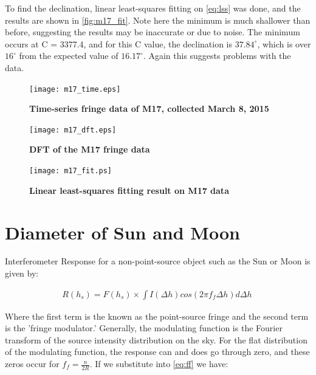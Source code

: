 \documentclass{article}
\begin{document}
To find the declination, linear least-squares fitting on \autoref{eq:lss} was done, and the results are shown in \autoref{fig:m17_fit}. Note here the minimum is much shallower than before, suggesting the results may be inaccurate or due to noise. The minimum occurs at C = 3377.4, and for this C value, the declination is $37.84^\circ$, which is over $16^\circ$ from the expected value of $16.17^\circ$. Again this suggests problems with the data.



\begin{figure}
\begin{center}
\texttt{[image: m17\_time.eps]}
\caption{\bf{Time-series fringe data of M17, collected March 8, 2015}}
\label{fig:m17_time}
\end{center}
\end{figure}

\begin{figure}
\begin{center}
\texttt{[image: m17\_dft.eps]}
\caption{\bf{DFT of the M17 fringe data}}
\label{fig:m17_dft}
\end{center}
\end{figure}

\begin{figure}
\begin{center}
\texttt{[image: m17\_fit.ps]}
\caption{\bf{Linear least-squares fitting result on M17 data}}
\label{fig:m17_fit}
\end{center}
\end{figure}



\section{Diameter of Sun and Moon}   

Interferometer Response for a non-point-source object such as the Sun or Moon is given by:

\begin{eqnarray}
R(h_s) = F(h_s) \times \int  I(\Delta h) cos(2\pi f_f \Delta h) d\Delta h\
\label{eq:Rhs}
\end{eqnarray}

Where the first term is the known as the point-source fringe and the second term is the 'fringe modulator.' Generally, the modulating function is the Fourier transform of the source intensity distribution on the sky. For the flat distribution of the modulating function, the response can and does go through zero, and these zeros occur for $f_f = \frac{n}{2R}$. If we substitute into \autoref{eq:ff}  we have:
\end{document}
